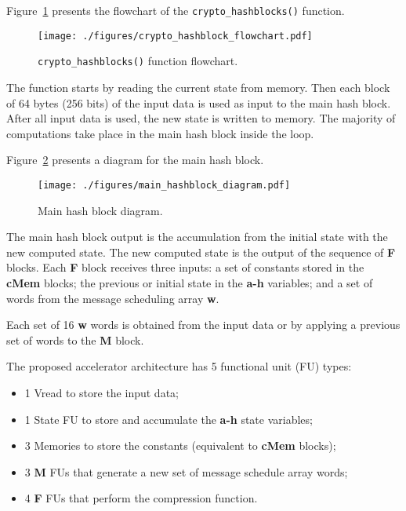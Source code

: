 Figure~\ref{fig:hash_flowchart} presents the flowchart of the
\texttt{crypto\_hashblocks()} function.

\begin{figure}[!htbp]
    \centerline{\texttt{[image: ./figures/crypto\_hashblock\_flowchart.pdf]}}
    \vspace{0cm}\caption{\texttt{crypto\_hashblocks()} function flowchart.}
    \label{fig:hash_flowchart}
\end{figure}

The function starts by reading the current state from memory. Then each block
of 64 bytes (256 bits) of the input data is used as input to the main hash
block.
After all input data is used, the new state is written to memory.
The majority of computations take place in the main hash block inside the loop.

Figure~\ref{fig:main_hashblock_diagram} presents a diagram for the main hash
block.

\begin{figure}[!htbp]
    \centerline{\texttt{[image: ./figures/main\_hashblock\_diagram.pdf]}}
    \vspace{0cm}\caption{Main hash block diagram.}
    \label{fig:main_hashblock_diagram}
\end{figure}

The main hash block output is the accumulation from the initial state with the
new computed state.
The new computed state is the output of the sequence of \textbf{F} blocks. Each
\textbf{F} block receives three inputs: a set of constants stored in the
\textbf{cMem} blocks; the previous or initial state in the \textbf{a-h}
variables; and a set of words from the message scheduling array \textbf{w}.

Each set of 16 \textbf{w} words is obtained from the input data or by applying a
previous set of words to the \textbf{M} block.

The proposed accelerator architecture has 5 functional unit (FU) types:
\begin{itemize}
    \item 1 Vread to store the input data;
    \item 1 State FU to store and accumulate the \textbf{a-h} state variables;
    \item 3 Memories to store the constants (equivalent to \textbf{cMem}
        blocks);
    \item 3 \textbf{M} FUs that generate a new set of message schedule array
        words;
    \item 4 \textbf{F} FUs that perform the compression function.
\end{itemize}

